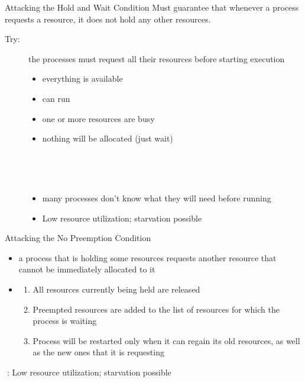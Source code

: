 \begin{frame}
  \begin{block}{Attacking the Hold and Wait Condition}
    Must guarantee that whenever a process requests a resource, it does not hold any other
    resources.
    \begin{description}
    \item[Try:] the processes must request all their resources before starting
      execution
      \begin{itemize}
      \item[if] everything is available
      \item[then] can run
      \item[if] one or more resources are busy
      \item[then] nothing will be allocated (just wait)
      \end{itemize}
    \item[\textcolor{red}{🙁}] \ 
      \begin{itemize}
      \item many processes don't know what they will need before running
      \item Low resource utilization; starvation possible
      \end{itemize}
    \end{description}
  \end{block}
\end{frame}

\begin{frame}
  \begin{block}{Attacking the No Preemption Condition}
    \begin{itemize}
    \item[if] a process that is holding some resources requests another resource that
      cannot be immediately allocated to it
    \item[then]
      \begin{enumerate}
      \item All resources currently being held are released
      \item Preempted resources are added to the list of resources for which the process
        is waiting
      \item Process will be restarted only when it can regain its old resources, as well
        as the new ones that it is requesting
      \end{enumerate}
    \end{itemize}
  \end{block}
  \textcolor{red}{🙁}: Low resource utilization; starvation possible
\end{frame}

